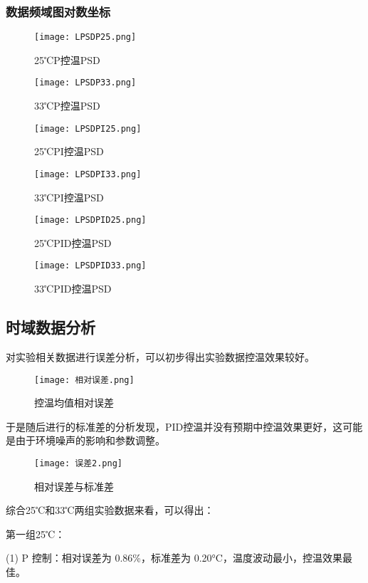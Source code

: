 \documentclass[dvipsnames, svgnames,a4paper,11pt]{article}
\begin{document}
	\subsubsection{数据频域图对数坐标}
	\begin{figure}[{H}]
		\centering
		\texttt{[image: LPSDP25.png]}
		\caption{25℃P控温PSD}
		\label{}
	\end{figure}
	\begin{figure}[{H}]
		\centering
		\texttt{[image: LPSDP33.png]}
		\caption{33℃P控温PSD}
		\label{}
	\end{figure}
	\begin{figure}[{H}]
		\centering
		\texttt{[image: LPSDPI25.png]}
		\caption{25℃PI控温PSD}
		\label{}
	\end{figure}
	\begin{figure}[{H}]
		\centering
		\texttt{[image: LPSDPI33.png]}
		\caption{33℃PI控温PSD}
		\label{}
	\end{figure}
	\begin{figure}[{H}]
		\centering
		\texttt{[image: LPSDPID25.png]}
		\caption{25℃PID控温PSD}
		\label{}
	\end{figure}
	\begin{figure}[{H}]
		\centering
		\texttt{[image: LPSDPID33.png]}
		\caption{33℃PID控温PSD}
		\label{}
	\end{figure}
	
	\subsection{时域数据分析}
	对实验相关数据进行误差分析，可以初步得出实验数据控温效果较好。
	\begin{figure}[{H}]
		\centering
		\texttt{[image: 相对误差.png]}
		\caption{控温均值相对误差}
		\label{}
	\end{figure}
	于是随后进行的标准差的分析发现，PID控温并没有预期中控温效果更好，这可能是由于环境噪声的影响和参数调整。
	\begin{figure}[{H}]
		\centering
		\texttt{[image: 误差2.png]}
		\caption{相对误差与标准差}
		\label{}
	\end{figure}

	综合25℃和33℃两组实验数据来看，可以得出：

第一组25℃：

(1) P 控制：相对误差为 0.86\%，标准差为 0.20°C，温度波动最小，控温效果最佳。
\end{document}
